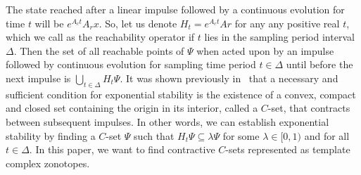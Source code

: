 
The state reached after a linear impulse followed by a continuous
evolution for time $t$ will be $e^{A_ct}A_rx$.  So, let us denote
$H_t=e^{A_ct}Ar$ for any any positive real $t$, which we call as the
reachability operator if $t$ lies in the sampling period interval
$\Delta$.  Then the set of all reachable points of $\Psi$ when acted
upon by an impulse followed by continuous evolution for sampling time
period $t\in\Delta$ until before the next impulse is
$\bigcup_{t\in\Delta}H_t\Psi$.  It was shown previously
in~\cite{2014-fiacchini-set,AlKhatib2015} that a necessary and
sufficient condition for exponential stability is the existence of a
convex, compact and closed set containing the origin in its interior,
called a $C$-set, that contracts between subsequent impulses.  In
other words, we can establish exponential stability by finding a
$C$-set $\Psi$ such that $H_t\Psi\subseteq\lambda\Psi$ for some
$\lambda\in[0,1)$ and for all $t\in\Delta$.
In this paper, we want to find contractive $C$-sets represented as
template complex zonotopes.  %
